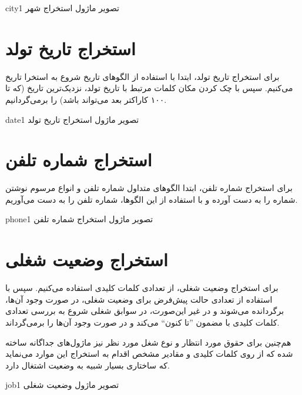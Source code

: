 \documentclass{article}
\begin{document}
	
	
	
	\begin{image}{0.25}{city}{1}
		تصویر ماژول استخراج شهر
	\end{image}
	
	
	\section{استخراج تاریخ تولد}
	
	برای استخراج تاریخ تولد، ابتدا با استفاده از الگوهای تاریخ شروع به استخرا تاریخ می‌کنیم. سپس با چک کردن مکان کلمات مرتبط با تاریخ تولد، نزدیک‌ترین تاریخ (که تا ۱۰۰ کاراکتر بعد می‌تواند باشد) را برمی‌گردانیم.
	
	
	
	
	\begin{image}{0.25}{date}{1}
		تصویر ماژول استخراج تاریخ تولد
	\end{image}


	\section{استخراج شماره تلفن}
	
	برای استخراج شماره تلفن، ابتدا  الگوهای متداول شماره تلفن و انواع مرسوم نوشتن شماره را به دست آورده و با استفاده از این الگوها، شماره تلفن را به دست می‌آوریم.
	
	
	
	
	\begin{image}{0.3}{phone}{1}
		تصویر ماژول استخراج شماره تلفن
	\end{image}

	\section{استخراج وضعیت شغلی}
	
	برای استخراج وضعیت شغلی، از تعدادی کلمات کلیدی استفاده می‌کنیم. سپس با استفاده از تعدادی حالت پیش‌فرض برای وضعیت شغلی، در صورت وجود آن‌ها، برگردانده می‌شوند و در غیر این‌صورت، در سوابق شغلی شروع به بررسی تعدادی کلمات کلیدی با مضمون ''تا کنون`` می‌کند و در صورت وجود آن‌ها را برمی‌گرداند.
	
	هم‌چنین برای حقوق مورد انتظار و نوع شغل مورد نظر نیز ماژول‌های جداگانه ساخته شده که از روی کلمات کلیدی و مقادیر مشخص اقدام به استخراج این موارد می‌نماید که ساختاری بسیار شبیه به وضعیت اشتغال دارد.
	
	
	\begin{image}{0.4}{job}{1}
		تصویر ماژول وضعیت شغلی
	\end{image}
\end{document}
